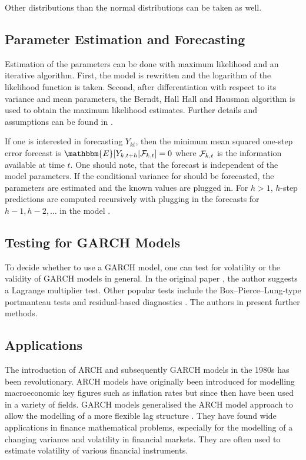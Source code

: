 Other distributions than the normal distributions can be taken as well. 

\subsection{Parameter Estimation and Forecasting}
\label{sec: GARCH Parameter Estimation and Forecasting}

Estimation of the parameters can be done with maximum likelihood and an iterative algorithm. First, the model is rewritten and the logarithm of the likelihood function is taken. Second, after differentiation with respect to its variance and mean parameters, the Berndt, Hall Hall and Hausman algorithm \cite{Berndt:1974}is used to obtain the maximum likelihood estimates. Further details and assumptions can be found in \cite{Bollerslev:1986}. 

If one is interested in forecasting $Y_{kt}$, then the minimum mean squared one-step error forecast is $\mathbbm{E}[Y_{k,t+h}|\SigA_{k,t}]=0$ where $\mathcal{F}_{k,t}$ is the information available at time $t$. One should note, that the forecast is independent of the model parameters. If the conditional variance for should be forecasted, the parameters are estimated and the known values are plugged in. For $h>1$, $h$-step predictions are computed recursively with plugging in the forecasts for $h-1,h-2,\ldots$ in the model \cite{Zivot:2009}. 


\subsection{Testing for GARCH Models}
\label{sec: Testing for GARCH models}

To decide whether to use a GARCH model, one can test for volatility or the validity of GARCH models in general. In the original paper \cite{Bollerslev:1986}, the author suggests a Lagrange multiplier test. Other popular tests include the Box–Pierce–Lung‐type portmanteau tests and residual‐based diagnostics \cite{Hong:2017}. The authors in \cite{Hong:2017} present further methods. 


\subsection{Applications}
\label{sec: Garch Applications}

The introduction of ARCH and subsequently GARCH models in the 1980s has been revolutionary. ARCH models have originally been introduced for modelling macroeconomic key figures such as inflation rates but since then have been used in a variety of fields. GARCH models generalised the ARCH model approach to allow the modelling of a more flexible lag structure \cite{Bollerslev:1986}. They have found wide applications in finance mathematical problems, especially for the modelling of a changing variance and volatility in financial markets. They are often used to estimate volatility of various financial instruments. 

